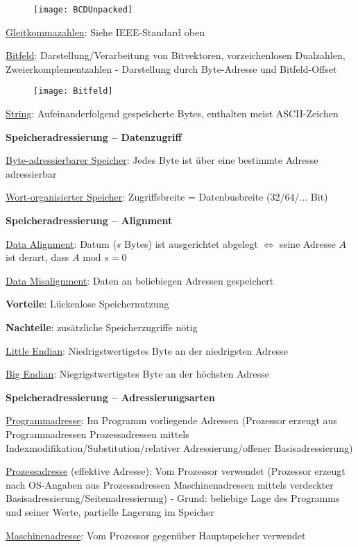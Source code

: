 \begin{items}
\begin{figure}[ht]
	  \centering
	  \texttt{[image: BCDUnpacked]}
	  \label{BCDUnpacked}
	\end{figure}
	\item \underline{Gleitkommazahlen}: Siehe IEEE-Standard oben
	\item \underline{Bitfeld}: Darstellung/Verarbeitung von Bitvektoren, vorzeichenlosen Dualzahlen, Zweierkomplementzahlen - Darstellung durch Byte-Adresse und Bitfeld-Offset
	\begin{figure}[ht]
	  \centering
	  \texttt{[image: Bitfeld]}
	  \label{Bitfeld}
	\end{figure}
	\item \underline{String}: Aufeinanderfolgend gespeicherte Bytes, enthalten meist ASCII-Zeichen
\end{items}

\textbf{Speicheradressierung -- Datenzugriff}
\begin{enumeration}
	\item \underline{Byte-adressierbarer Speicher}: Jedes Byte ist über eine bestimmte Adresse adressierbar
	\item \underline{Wort-organisierter Speicher}: Zugriffsbreite = Datenbusbreite (32/64/... Bit)
\end{enumeration}

\textbf{Speicheradressierung -- Alignment}
\begin{items}
	\item \underline{Data Alignment}: Datum ($s$ Bytes) ist ausgerichtet abgelegt $\Leftrightarrow$ seine Adresse $A$ ist derart, dass $A \text{ mod } s = 0$
	\item \underline{Data Misalignment}: Daten an beliebiegen Adressen gespeichert
	\begin{items}
		\item \textbf{Vorteile}: Lückenlose Speichernutzung
		\item \textbf{Nachteile}: zusätzliche Speicherzugriffe nötig
	\end{items}
	\item \underline{Little Endian}: Niedrigstwertigstes Byte an der niedrigsten Adresse
	\item \underline{Big Endian}: Niegrigstwertigstes Byte an der höchsten Adresse
\end{items}

\textbf{Speicheradressierung -- Adressierungsarten}
\begin{enumeration}
	\item \underline{Programmadresse}: Im Programm vorliegende Adressen (Prozessor erzeugt aus Programmadressen Prozessadressen mittels Indexmodifikation/Substitution/relativer Adressierung/offener Basisadressierung)
	\item \underline{Prozessadresse} (effektive Adresse): Vom Prozessor verwendet (Prozessor erzeugt nach OS-Angaben aus Prozessadressen Maschinenadressen mittels verdeckter Basisadressierung/Seitenadressierung) - Grund: beliebige Lage des Programms und seiner Werte, partielle Lagerung im Speicher 
	\item \underline{Maschinenadresse}: Vom Prozessor gegenüber Hauptspeicher verwendet
\end{enumeration}

